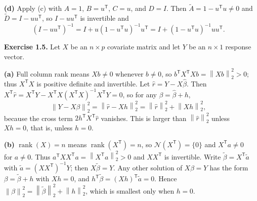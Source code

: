 \documentclass[answers,12pt,addpoints]{exam}
\providecommand{\R}{\mathbb{R}}
\newcommand{\trans}{^{\mathsf T}}
\newcommand{\normtwo}[1]{\left\lVert #1\right\rVert_2}
\newcommand{\nul}{\mathcal{N}}
\begin{document}
\begin{questions}
\begin{solution}
\textbf{(d)} Apply (c) with $A=1$, $B=u\trans$, $C=u$, and $D=I$. Then
$\widetilde A=1-u\trans u\neq0$ and $\widetilde D=I-uu\trans$, so $I-uu\trans$
is invertible and
\[
(I-uu\trans)^{-1}=I+u(1-u\trans u)^{-1}u\trans=I+(1-u\trans u)^{-1}uu\trans.
\]
\end{solution}
 
\question \textbf{Exercise 1.5.}
Let $X$ be an $n\times p$ covariate matrix and let $Y$ be an $n\times1$
response vector.
 
 
\begin{solution}
\textbf{(a)} Full column rank means $Xb\neq0$ whenever $b\neq0$, so
$b\trans X\trans Xb=\normtwo{Xb}^2>0$; thus $X\trans X$ is positive definite and
invertible. Let $\widehat r=Y-X\widehat\beta$. Then
$X\trans\widehat r=X\trans Y-X\trans X(X\trans X)^{-1}X\trans Y=0$, so for any $\beta=\widehat\beta+h$,
\[
\normtwo{Y-X\beta}^2=\normtwo{\widehat r-Xh}^2
=\normtwo{\widehat r}^2+\normtwo{Xh}^2,
\]
because the cross term $2h\trans X\trans\widehat r$ vanishes. This is larger
than $\normtwo{\widehat r}^2$ unless $Xh=0$, that is, unless $h=0$.
 
\textbf{(b)} $\operatorname{rank}(X)=n$ means $\operatorname{rank}(X\trans)=n$,
so $\nul(X\trans)=\{0\}$ and $X\trans a\neq0$ for $a\neq0$. Thus
$a\trans XX\trans a=\normtwo{X\trans a}^2>0$ and $XX\trans$ is invertible.
Write $\widetilde\beta=X\trans\widetilde a$ with $\widetilde a=(XX\trans)^{-1}Y$;
then $X\widetilde\beta=Y$. Any other solution of $X\beta=Y$ has the form
$\beta=\widetilde\beta+h$ with $Xh=0$, and
$h\trans\widetilde\beta=(Xh)\trans\widetilde a=0$. Hence
$\normtwo{\beta}^2=\normtwo{\widetilde\beta}^2+\normtwo{h}^2$, which is smallest
only when $h=0$.
 

\end{solution}
\end{questions}
\end{document}
